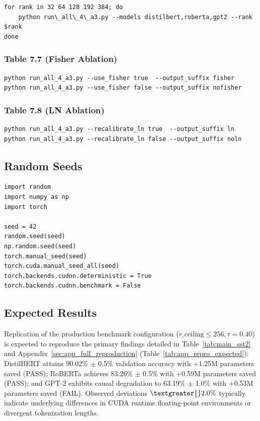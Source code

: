 \begin{lstlisting}
for rank in 32 64 128 192 384; do
    python run\_all\_4\_a3.py --models distilbert,roberta,gpt2 --rank $rank
done
\end{lstlisting}

\subsubsection{Table 7.7 (Fisher Ablation)}

\begin{lstlisting}
python run_all_4_a3.py --use_fisher true  --output_suffix fisher
python run_all_4_a3.py --use_fisher false --output_suffix nofisher
\end{lstlisting}

\subsubsection{Table 7.8 (LN Ablation)}

\begin{lstlisting}
python run_all_4_a3.py --recalibrate_ln true  --output_suffix ln
python run_all_4_a3.py --recalibrate_ln false --output_suffix noln
\end{lstlisting}

\subsection{Random Seeds}

\begin{lstlisting}
import random
import numpy as np
import torch

seed = 42
random.seed(seed)
np.random.seed(seed)
torch.manual_seed(seed)
torch.cuda.manual_seed_all(seed)
torch.backends.cudnn.deterministic = True
torch.backends.cudnn.benchmark = False
\end{lstlisting}

\subsection{Expected Results}

Replication of the production benchmark configuration ($r\_{\mathrm{ceiling}} \le 256, \tau=0.40$) is expected to reproduce the primary findings detailed in Table~\ref{tab:main_sst2} and Appendix~\ref{sec:app_full_reproduction} (Table~\ref{tab:app_repro_expected}): DistilBERT attains 90.02\% $\pm$ 0.5\% validation accuracy with +1.25M parameters saved (PASS); RoBERTa achieves 83.26\% $\pm$ 0.5\% with +0.59M parameters saved (PASS); and GPT-2 exhibits causal degradation to 63.19\% $\pm$ 1.0\% with +0.53M parameters saved (FAIL). Observed deviations $\textgreater{}2.0\%$ typically indicate underlying differences in CUDA runtime floating-point environments or divergent tokenization lengths.

